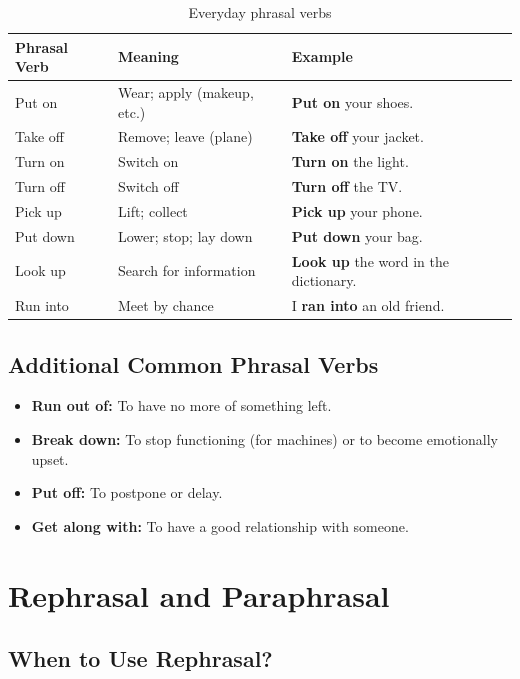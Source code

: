 \begin{table}[h]
\centering
\begin{tabular}{|l|l|l|}
\hline
\textbf{Phrasal Verb} & \textbf{Meaning} & \textbf{Example} \\
\hline
Put on & Wear; apply (makeup, etc.) & \textbf{Put on} your shoes. \\
\hline
Take off & Remove; leave (plane) & \textbf{Take off} your jacket. \\
\hline
Turn on & Switch on & \textbf{Turn on} the light. \\
\hline
Turn off & Switch off & \textbf{Turn off} the TV. \\
\hline
Pick up & Lift; collect & \textbf{Pick up} your phone. \\
\hline
Put down & Lower; stop; lay down & \textbf{Put down} your bag. \\
\hline
Look up & Search for information & \textbf{Look up} the word in the dictionary. \\
\hline
Run into & Meet by chance & I \textbf{ran into} an old friend. \\
\hline
\end{tabular}
\caption{Everyday phrasal verbs}
\end{table}

\subsection{Additional Common Phrasal Verbs}
\begin{itemize}
    \item \textbf{Run out of:} To have no more of something left.
    \item \textbf{Break down:} To stop functioning (for machines) or to become emotionally upset.
    \item \textbf{Put off:} To postpone or delay.
    \item \textbf{Get along with:} To have a good relationship with someone.
\end{itemize}

\section{Rephrasal and Paraphrasal}

\subsection{When to Use Rephrasal?}


